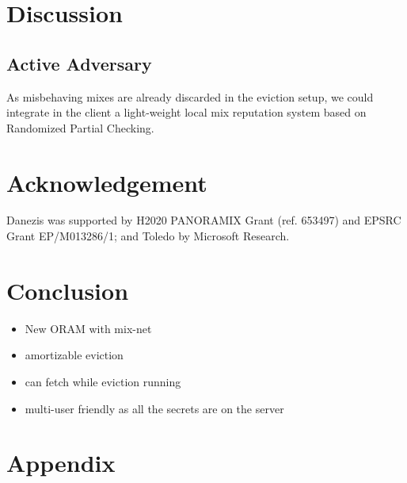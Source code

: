 \documentclass[USenglish,oneside,twocolumn]{article}
\begin{document}
\section{Discussion}\label{Discussion}

\subsection{Active Adversary}\label{Active Adversary}
As misbehaving mixes are already discarded in the eviction setup, we could integrate in the client a light-weight local mix reputation system based on Randomized Partial Checking.


\section{Acknowledgement}
Danezis was supported by H2020  PANORAMIX Grant (ref. 653497) and EPSRC Grant EP/M013286/1; and Toledo by Microsoft Research.


\section{Conclusion}\label{Conclusion}
\begin{itemize}
 \item New ORAM with mix-net
 \item amortizable eviction
 \item can fetch while eviction running
 \item multi-user friendly as all the secrets are on the server
\end{itemize}




\section{Appendix}
\end{document}
